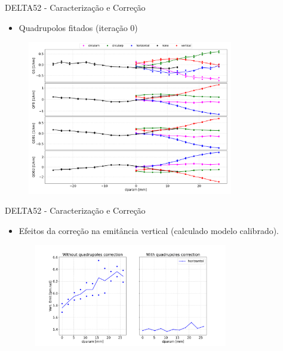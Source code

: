 \documentclass{beamer}					  %
\begin{document}
\begin{frame}{DELTA52 - Caracterização e Correção}
    \begin{itemize}
    		\item Quadrupolos fitados (iteração 0)
    \end{itemize}
    \begin{figure}[H]
        	\centering
            \includegraphics[width=0.8\textwidth]{2024-01-26/figures/knobs-before.png}
            \label{fig:bba}
    \end{figure} 
\end{frame}


\begin{frame}{DELTA52 - Caracterização e Correção}
    \begin{itemize}
    		\item Efeitos da correção na emitância vertical (calculado modelo calibrado).
    \end{itemize}
    \begin{figure}[H]
        	\centering
            \includegraphics[height=4.5cm, width=9cm]{2024-01-26/figures/quad_ffwd_emit_effect.png}\\ 
    \end{figure} 
\end{frame}
\end{document}
